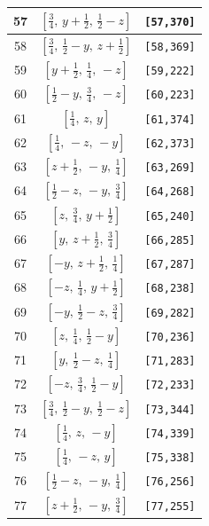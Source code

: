 \documentclass[fleqn,8pt]{jsarticle}
\begin{document}
\begin{longtable}{ccc}
57 & $\left[ \frac{3}{4},\, y + \frac{1}{2},\, \frac{1}{2} - z \right]$ & {\tt [57,370]} \\ \hline
58 & $\left[ \frac{3}{4},\, \frac{1}{2} - y,\, z + \frac{1}{2} \right]$ & {\tt [58,369]} \\ \hline
59 & $\left[ y + \frac{1}{2},\, \frac{1}{4},\, - z \right]$ & {\tt [59,222]} \\ \hline
60 & $\left[ \frac{1}{2} - y,\, \frac{3}{4},\, - z \right]$ & {\tt [60,223]} \\ \hline
61 & $\left[ \frac{1}{4},\, z,\, y \right]$ & {\tt [61,374]} \\ \hline
62 & $\left[ \frac{1}{4},\, - z,\, - y \right]$ & {\tt [62,373]} \\ \hline
63 & $\left[ z + \frac{1}{2},\, - y,\, \frac{1}{4} \right]$ & {\tt [63,269]} \\ \hline
64 & $\left[ \frac{1}{2} - z,\, - y,\, \frac{3}{4} \right]$ & {\tt [64,268]} \\ \hline
65 & $\left[ z,\, \frac{3}{4},\, y + \frac{1}{2} \right]$ & {\tt [65,240]} \\ \hline
66 & $\left[ y,\, z + \frac{1}{2},\, \frac{3}{4} \right]$ & {\tt [66,285]} \\ \hline
67 & $\left[ - y,\, z + \frac{1}{2},\, \frac{1}{4} \right]$ & {\tt [67,287]} \\ \hline
68 & $\left[ - z,\, \frac{1}{4},\, y + \frac{1}{2} \right]$ & {\tt [68,238]} \\ \hline
69 & $\left[ - y,\, \frac{1}{2} - z,\, \frac{3}{4} \right]$ & {\tt [69,282]} \\ \hline
70 & $\left[ z,\, \frac{1}{4},\, \frac{1}{2} - y \right]$ & {\tt [70,236]} \\ \hline
71 & $\left[ y,\, \frac{1}{2} - z,\, \frac{1}{4} \right]$ & {\tt [71,283]} \\ \hline
72 & $\left[ - z,\, \frac{3}{4},\, \frac{1}{2} - y \right]$ & {\tt [72,233]} \\ \hline
73 & $\left[ \frac{3}{4},\, \frac{1}{2} - y,\, \frac{1}{2} - z \right]$ & {\tt [73,344]} \\ \hline
74 & $\left[ \frac{1}{4},\, z,\, - y \right]$ & {\tt [74,339]} \\ \hline
75 & $\left[ \frac{1}{4},\, - z,\, y \right]$ & {\tt [75,338]} \\ \hline
76 & $\left[ \frac{1}{2} - z,\, - y,\, \frac{1}{4} \right]$ & {\tt [76,256]} \\ \hline
77 & $\left[ z + \frac{1}{2},\, - y,\, \frac{3}{4} \right]$ & {\tt [77,255]} \\ \hline

\end{longtable}
\end{document}
